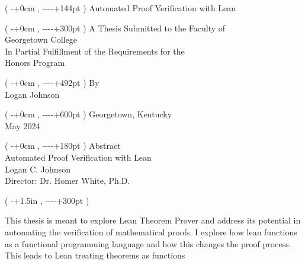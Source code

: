 \newcommand{\fromtop}[1]{%
  \dimexpr-1in-\topskip-\topmargin-\headheight-\headsep+#1\relax
}
\newcommand{\fromleft}[1]{%
  \dimexpr-1in-\oddsidemargin+#1\relax
}
\setlength{\textwidth}{6in}
\begin{titlepage}
\cleardoublepage
\thispagestyle{empty}
\begin{textblock*}{\paperwidth}(\fromleft{0cm},\fromtop{144pt})
\centering
Automated Proof Verification with Lean
\end{textblock*}
\begin{textblock*}{\paperwidth}(\fromleft{0cm},\fromtop{300pt})
\centering
A Thesis Submitted to the Faculty of\\
\vspace{12pt}
Georgetown College\\
\vspace{12pt}
In Partial Fulfillment of the Requirements for the\\
\vspace{12pt}
Honors Program
\end{textblock*}
\begin{textblock*}{\paperwidth}(\fromleft{0cm},\fromtop{492pt})
\centering
By\\
\vspace{12pt}
Logan Johnson
\end{textblock*}
\begin{textblock*}{\paperwidth}(\fromleft{0cm},\fromtop{600pt})
\centering
Georgetown, Kentucky\\
\vspace{12pt}
May 2024
\end{textblock*}
\pagebreak
\thispagestyle{empty}
\begin{textblock*}{\paperwidth}(\fromleft{0cm},\fromtop{180pt})
\centering
Abstract\\
\vspace{12pt}
Automated Proof Verification with Lean\\
\vspace{12pt}
Logan C. Johnson\\
\vspace{12pt}
Director: Dr. Homer White, Ph.D.
\end{textblock*}
\begin{textblock*}{\textwidth}(\fromleft{1.5in},\fromtop{300pt})
\raggedright
This thesis is meant to explore Lean Theorem Prover and address its potential in automating the 
verification of mathematical proofs. I explore how lean functions as a functional programming 
language and how this changes the proof process. This leads to Lean treating theorems as functions 

\end{textblock*}
\end{titlepage}
